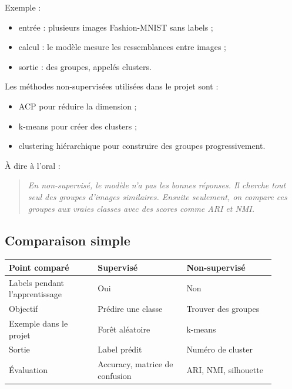 \documentclass[11pt,a4paper]{article}
\begin{document}
Exemple :

\begin{itemize}
\item entrée : plusieurs images Fashion-MNIST sans labels ;
\item calcul : le modèle mesure les ressemblances entre images ;
\item sortie : des groupes, appelés clusters.
\end{itemize}

Les méthodes non-supervisées utilisées dans le projet sont :

\begin{itemize}
\item ACP pour réduire la dimension ;
\item k-means pour créer des clusters ;
\item clustering hiérarchique pour construire des groupes progressivement.
\end{itemize}

À dire à l'oral :

\begin{quote}
\itshape En non-supervisé, le modèle n'a pas les bonnes réponses. Il cherche tout seul des groupes d'images similaires. Ensuite seulement, on compare ces groupes aux vraies classes avec des scores comme ARI et NMI.
\end{quote}

\subsection{Comparaison simple}

\begin{center}
\small
\begin{tabular}{|>{\RaggedRight\arraybackslash}p{0.30\linewidth}|>{\RaggedRight\arraybackslash}p{0.30\linewidth}|>{\RaggedRight\arraybackslash}p{0.30\linewidth}|}
\hline
Point comparé & Supervisé & Non-supervisé \\
\hline
Labels pendant l'apprentissage & Oui & Non \\
\hline
Objectif & Prédire une classe & Trouver des groupes \\
\hline
Exemple dans le projet & Forêt aléatoire & k-means \\
\hline
Sortie & Label prédit & Numéro de cluster \\
\hline
Évaluation & Accuracy, matrice de confusion & ARI, NMI, silhouette \\
\hline
\end{tabular}
\end{center}
\end{document}
